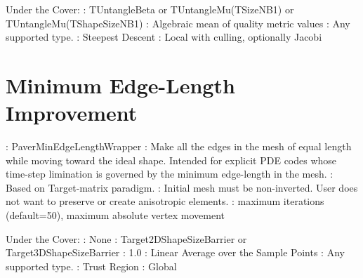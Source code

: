 \noindent Under the Cover: \newline
{}: TUntangleBeta or TUntangleMu(TSizeNB1) or TUntangleMu(TShapeSizeNB1) \newline
{}: Algebraic mean of quality metric values \newline
{}: Any supported type. \newline
{}: Steepest Descent \newline
{}: Local with culling, optionally Jacobi \newline


\section{Minimum Edge-Length Improvement} \label{sec:PaverMinEdgeLengthWrapper}

: PaverMinEdgeLengthWrapper \newline
{}: Make all the edges in the mesh of equal length while 
moving toward the ideal shape. Intended for explicit PDE codes whose 
time-step limination is governed by the minimum edge-length in the mesh. \newline
{}: Based on Target-matrix paradigm. \newline
{}: Initial mesh must be non-inverted. User does not want to preserve or create anisotropic elements. \newline 
{}: maximum iterations (default=50), maximum absolute vertex movement \newline \newline

\noindent Under the Cover: \newline
{}: None \newline
{}:  Target2DShapeSizeBarrier or Target3DShapeSizeBarrier \newline
{}: 1.0 \newline
{}: Linear Average over the Sample Points \newline
{}: Any supported type.  \newline
{}: Trust Region \newline
{}: Global \newline

